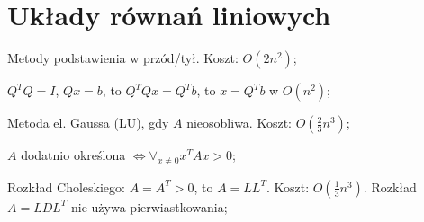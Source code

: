 \section{Układy równań liniowych}

\entry
Metody podstawienia w przód/tył. Koszt: $O(2n^2)$;

\entry
$Q^TQ=I$, $Qx=b$, to $Q^TQx=Q^Tb$, to $x=Q^Tb$ w $O(n^2)$;



\entry
Metoda el. Gaussa (LU), gdy $A$ nieosobliwa. Koszt: $O(\frac{2}{3}n^3)$;

\entry
$A$ dodatnio określona $\iff \forall_{x \neq 0} x^TAx>0$;

\entry
Rozkład Choleskiego: $A=A^T>0$, to $A=LL^T$. Koszt: $O(\frac{1}{3}n^3)$. Rozkład $A=LDL^T$ nie używa pierwiastkowania;
